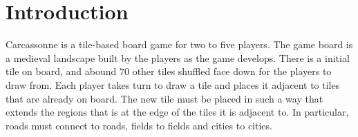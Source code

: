\section{Introduction}
Carcassonne is a tile-based board game for two to five players.  The game board
is a medieval landscape built by the players as the game develops. There is a
initial tile on board, and abound 70 other tiles shuffled face down for the
players to draw from.  Each player takes turn to draw a tile and places it
adjacent to tiles that are already on board. The new tile must be placed in
such a way that extends the regions that is at the edge of the tiles it is
adjacent to.  In particular, roads must connect to roads, fields to fields and
cities to cities.
